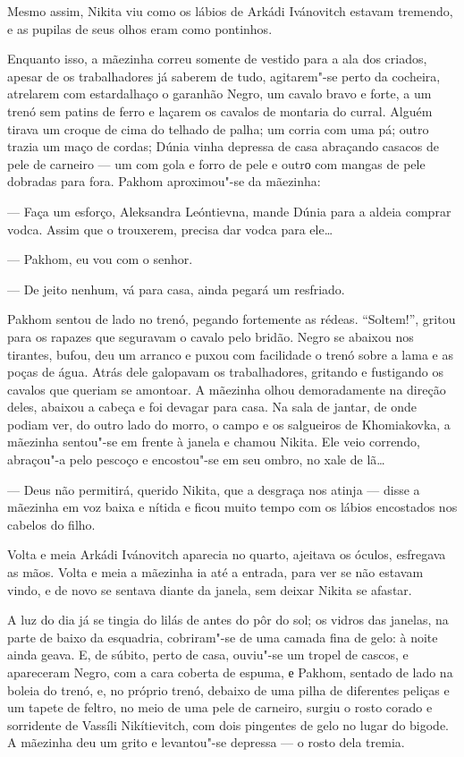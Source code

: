 Mesmo assim, Nikita viu como os lábios de Arkádi Ivánovitch estavam
tremendo, e as pupilas de seus olhos eram como pontinhos.

Enquanto isso, a mãezinha correu somente de vestido para a ala dos
criados, apesar de os trabalhadores já saberem de tudo, agitarem"-se
perto da cocheira, atrelarem com estardalhaço o garanhão Negro, um
cavalo bravo e forte, a um trenó sem patins de ferro e laçarem os
cavalos de montaria do curral. Alguém tirava um croque de cima do
telhado de palha; um corria com uma pá; outro trazia um maço de
cordas; Dúnia vinha depressa de casa abraçando casacos de pele de
carneiro --- um com gola e forro de pele e outrо com mangas de pele
dobradas para fora. Pakhom aproximou"-se da mãezinha:

--- Faça um esforço, Aleksandra Leóntievna, mande Dúnia para a aldeia
comprar vodca. Assim que o trouxerem, precisa dar vodca para ele\ldots{}

--- Pakhom, eu vou com o senhor.

--- De jeito nenhum, vá para casa, ainda pegará um resfriado.

Pakhom sentou de lado no trenó, pegando fortemente as rédeas.
``Soltem!'', gritou para os rapazes que seguravam o cavalo pelo bridão.
Negro se abaixou nos tirantes, bufou, deu um arranco e puxou com
facilidade o trenó sobre a lama e as poças de água. Atrás dele galopavam
os trabalhadores, gritando e fustigando os cavalos que queriam se
amontoar. A mãezinha olhou demoradamente na direção deles, abaixou a
cabeça e foi devagar para casa. Na sala de jantar, de onde podiam ver, do outro lado do morro, o campo e os salgueiros de Khomiakovka,
a mãezinha sentou"-se em frente à janela e chamou Nikita. Ele veio correndo,
abraçou"-a pelo pescoço e encostou"-se em seu ombro, no xale de lã\ldots{}

--- Deus não permitirá, querido Nikita, que a desgraça nos atinja ---
disse a mãezinha em voz baixa e nítida e ficou muito tempo com os lábios
encostados nos cabelos do filho.

Volta e meia Arkádi Ivánovitch aparecia no quarto, ajeitava os óculos,
esfregava as mãos. Volta e meia a mãezinha ia até a entrada, para ver se
não estavam vindo, e de novo se sentava diante da janela, sem deixar
Nikita se afastar.

A luz do dia já se tingia do lilás de antes do pôr do sol; os vidros das
janelas, na parte de baixo da esquadria, cobriram"-se de uma camada fina
de gelo: à noite ainda geava. E, de súbito, perto de casa, ouviu"-se um
tropel de cascos, e apareceram Negro, com a cara coberta de espuma, е
Pakhom, sentado de lado na boleia do trenó, e, no próprio trenó, debaixo
de uma pilha de diferentes peliças e um tapete de feltro, no meio de uma
pele de carneiro, surgiu o rosto corado e sorridente de Vassíli
Nikítievitch, com dois pingentes de gelo no lugar do bigode. A mãezinha
deu um grito e levantou"-se depressa --- o rosto dela tremia.

